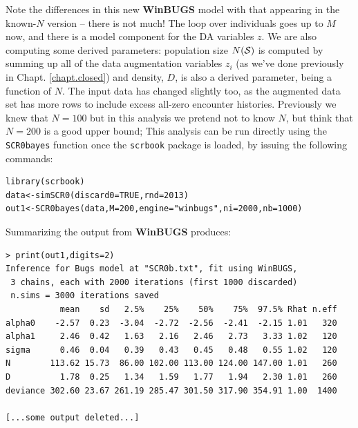 Note the differences in this new {\bf WinBUGS} model with that
appearing in the known-$N$ version -- there is not much!  The loop
over individuals goes up to $M$ now, and there is a model component
for the DA variables $z$. We are also computing some derived
parameters: population size $N({\cal S})$ is computed by summing up
all of the data augmentation variables $z_{i}$ (as we've done
previously in Chapt. \ref{chapt.closed}) and density, $D$, is also a
derived parameter, being a function of $N$.  The input data has
changed slightly too, as the augmented data set has more rows to
include excess all-zero encounter histories. Previously we knew that
$N=100$ but in this analysis we pretend not to know $N$, but think
that $N=200$ is a good upper bound;
This analysis can be run directly using the \mbox{\tt SCR0bayes}
function  once the \mbox{\tt scrbook} package is loaded,
by issuing the following commands:
\begin{verbatim}
library(scrbook)
data<-simSCR0(discard0=TRUE,rnd=2013)
out1<-SCR0bayes(data,M=200,engine="winbugs",ni=2000,nb=1000)
\end{verbatim}
Summarizing the output from {\bf WinBUGS} produces:
{\small
\begin{verbatim}
> print(out1,digits=2)
Inference for Bugs model at "SCR0b.txt", fit using WinBUGS,
 3 chains, each with 2000 iterations (first 1000 discarded)
 n.sims = 3000 iterations saved
           mean    sd   2.5%    25%    50%    75%  97.5% Rhat n.eff
alpha0    -2.57  0.23  -3.04  -2.72  -2.56  -2.41  -2.15 1.01   320
alpha1     2.46  0.42   1.63   2.16   2.46   2.73   3.33 1.02   120
sigma      0.46  0.04   0.39   0.43   0.45   0.48   0.55 1.02   120
N        113.62 15.73  86.00 102.00 113.00 124.00 147.00 1.01   260
D          1.78  0.25   1.34   1.59   1.77   1.94   2.30 1.01   260
deviance 302.60 23.67 261.19 285.47 301.50 317.90 354.91 1.00  1400

[...some output deleted...]

\end{verbatim}
}

